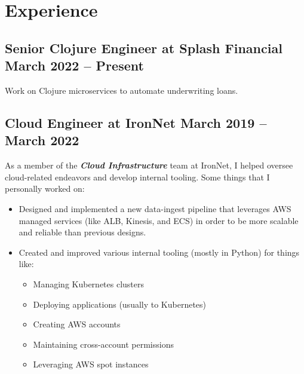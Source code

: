 \documentclass[12pt]{article}
\begin{document}

\section*{Experience}

\subsection*{Senior Clojure Engineer at Splash Financial \hfill March 2022 -- Present}

Work on Clojure microservices to automate underwriting loans.

    

\subsection*{Cloud Engineer at IronNet \hfill March 2019 -- March 2022}

As a member of the \textbf{\textsl{Cloud Infrastructure}} team at IronNet, I
helped oversee cloud-related endeavors and develop internal tooling. Some
things that I personally worked on:

\begin{itemize}
\item Designed and implemented a new data-ingest pipeline that leverages AWS
  managed services (like ALB, Kinesis, and ECS) in order to be more scalable and
  reliable than previous designs.
\item Created and improved various internal tooling (mostly in Python) for
  things like:

  \begin{multicols}{2}
    \raggedright
    \begin{itemize}
    \item Managing Kubernetes clusters
    \item Deploying applications (usually to Kubernetes)
    \item Creating AWS accounts
    \item Maintaining cross-account permissions
    \item Leveraging AWS spot instances
    \end{itemize}
  \end{multicols}

\end{itemize}
\end{document}
